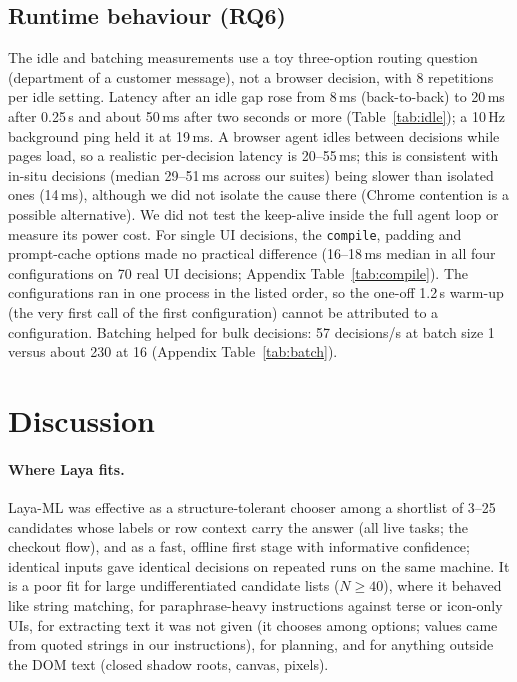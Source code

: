 \documentclass[11pt,a4paper]{article}
\begin{document}
\subsection{Runtime behaviour (RQ6)}
The idle and batching measurements use a toy three-option routing question (department of a customer message), not a browser decision, with 8 repetitions per idle setting. Latency after an idle gap rose from 8\,ms (back-to-back) to 20\,ms after 0.25\,s and about 50\,ms after two seconds or more (Table~\ref{tab:idle}); a 10\,Hz background ping held it at 19\,ms. A browser agent idles between decisions while pages load, so a realistic per-decision latency is 20--55\,ms; this is consistent with in-situ decisions (median 29--51\,ms across our suites) being slower than isolated ones (14\,ms), although we did not isolate the cause there (Chrome contention is a possible alternative). We did not test the keep-alive inside the full agent loop or measure its power cost. For single UI decisions, the \texttt{compile}, padding and prompt-cache options made no practical difference (16--18\,ms median in all four configurations on 70 real UI decisions; Appendix Table~\ref{tab:compile}). The configurations ran in one process in the listed order, so the one-off 1.2\,s warm-up (the very first call of the first configuration) cannot be attributed to a configuration. Batching helped for bulk decisions: 57 decisions/s at batch size 1 versus about 230 at 16 (Appendix Table~\ref{tab:batch}).

\begin{table}[t]\centering\small

\caption{Latency of one Laya-ML decision (toy three-option question) after an idle gap (8 repetitions per row).}\label{tab:idle}
\end{table}

\section{Discussion}
\paragraph{Where Laya fits.} Laya-ML was effective as a structure-tolerant chooser among a shortlist of 3--25 candidates whose labels or row context carry the answer (all live tasks; the checkout flow), and as a fast, offline first stage with informative confidence; identical inputs gave identical decisions on repeated runs on the same machine. It is a poor fit for large undifferentiated candidate lists ($N\ge40$), where it behaved like string matching, for paraphrase-heavy instructions against terse or icon-only UIs, for extracting text it was not given (it chooses among options; values came from quoted strings in our instructions), for planning, and for anything outside the DOM text (closed shadow roots, canvas, pixels).
\end{document}
